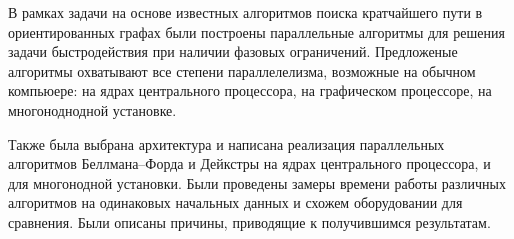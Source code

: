 В рамках задачи на основе известных алгоритмов поиска кратчайшего пути в ориентированных графах были построены параллельные алгоритмы для решения задачи быстродействия при наличии фазовых ограничений.
Предложеные алгоритмы охватывают все степени параллелелизма, возможные на обычном компьюере: на ядрах центрального процессора, на графическом процессоре, на многоноднодной установке.

Также была выбрана архитектура и написана реализация параллельных алгоритмов Беллмана--Форда и Дейкстры на ядрах центрального процессора, и для многонодной установки.
Были проведены замеры времени работы различных алгоритмов на одинаковых начальных данных и схожем оборудовании для сравнения. Были описаны причины, приводящие к получившимся результатам.